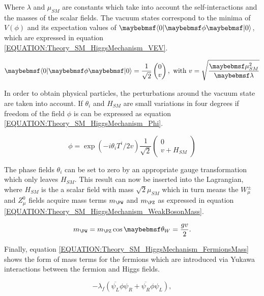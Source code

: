 Where $\lambda$ and $\mu_{SM}$ are constants which take into account the self-interactions and the masses of the scalar fields. The vacuum states correspond to the minima of $V(\phi)$ and its expectation values of $\bra{0}\phi\ket{0}$, which are expressed in equation \ref{EQUATION:Theory_SM_HiggsMechanism_VEV}.

\begin{equation}
\bra{0}\phi\ket{0} = \frac{1}{\sqrt{2}} \begin{pmatrix}0 \\ v \end{pmatrix},\text{ with } v=\sqrt{\frac{\mu_{SM}^{2}}{\lambda}} 
\label{EQUATION:Theory_SM_HiggsMechanism_VEV}
\end{equation}

In order to obtain physical particles, the perturbations around the vacuum state are taken into account. If $\theta_{i}$ and $H_{SM}$ are small variations in four degrees if freedom of the field $\phi$ is can be expressed as equation \ref{EQUATION:Theory_SM_HiggsMechanism_Phi}.

\begin{equation}
\phi = \exp(-i\theta_{i}T^{i}/2v)\frac{1}{\sqrt{2}}\begin{pmatrix} 0 \\ v+H_{SM} \end{pmatrix}
\label{EQUATION:Theory_SM_HiggsMechanism_Phi}
\end{equation}

The phase fields $\theta_{i}$ can be set to zero by an appropriate gauge transformation which only leaves $H_{SM}$. This result can now be inserted into the Lagrangian, where $H_{SM}$ is the a scalar field with mass $\sqrt{2}\mu_{SM}$ which in turn means the $W_{\mu}^{\pm}$ and $Z_{\mu}^{0}$ fields acquire mass terms $m_{\PW}$ and $m_{\PZ}$ as expressed in equation \ref{EQUATION:Theory_SM_HiggsMechanism_WeakBosonMass}.

\begin{equation}
m_{\PW} = m_{\PZ}\cos{\theta_{W}}=\frac{gv}{2}.
\label{EQUATION:Theory_SM_HiggsMechanism_WeakBosonMass}
\end{equation}

Finally, equation \ref{EQUATION:Theory_SM_HiggsMechanism_FermionsMass} shows the form of mass terms for the fermions which are introduced via Yukawa interactions between the fermion and Higgs fields.

\begin{equation}
-\lambda_{f}( \overline{\psi_{L}}\phi\psi_{R} + \overline{\psi_{R}}\phi\psi_{L}),  
\label{EQUATION:Theory_SM_HiggsMechanism_FermionsMass}
\end{equation}


